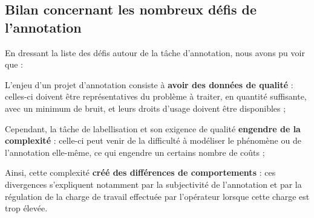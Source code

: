 	
	\subsection{Bilan concernant les nombreux défis de l'annotation}
	\label{section:2.3.4-DEFIS-ANNOTATION-BILAN}
	
	\begin{leftBarSummary}
		En dressant la liste des défis autour de la tâche d'annotation, nous avons pu voir que :
		\begin{todolist}
			\item[\itemok] L'enjeu d'un projet d'annotation consiste à \textbf{avoir des données de qualité} :
			celles-ci doivent être représentatives du problème à traiter, en quantité suffisante, avec un minimum de bruit, et leurs droits d'usage doivent être disponibles ;
			\item[\itemok] Cependant, la tâche de labellisation et son exigence de qualité \textbf{engendre de la complexité} :
			celle-ci peut venir de la difficulté à modéliser le phénomène ou de l'annotation elle-même, ce qui engendre un certains nombre de coûts ;
			\item[\itemok] Ainsi, cette complexité \textbf{créé des différences de comportements} : ces divergences s'expliquent notamment par la subjectivité de l'annotation et par la régulation de la charge de travail effectuée par l'opérateur lorsque cette charge est trop élevée.
		\end{todolist}
	\end{leftBarSummary}